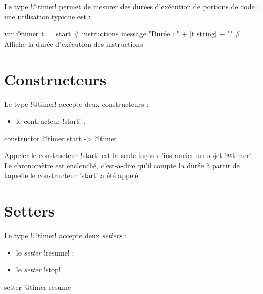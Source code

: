 



Le type \ggsq!@timer! permet de mesurer des durées d'exécution de portions de code ; une utilisation typique est :

\begin{galgas4}
var @timer t = .start
  # instructions
message "Durée : " + [t string] + "\n" # Affiche la durée d'exécution des instructions
\end{galgas4}


\section{Constructeurs}

Le type \ggsq!@timer! accepte deux constructeurs :
\begin{itemize}
  \item le contructeur \ggsq!start! ;
\end{itemize}



\begin{galgas4box}
constructor @timer start -> @timer
\end{galgas4box}

Appeler le constructeur \ggsq!start! est la seule façon d'instancier un objet \ggsq!@timer!. Le chronomètre est enclenché, c'est-à-dire qu'il compte la durée à partir de laquelle le constructeur \ggsq!start! a été appelé.







\section{Setters}

Le type \ggsq!@timer! accepte deux \emph{setters} :
\begin{itemize}
  \item le \emph{setter} \ggsq!resume! ;
  \item le \emph{setter} \ggsq!stop!.
\end{itemize}


\begin{galgas4box}
setter @timer resume
\end{galgas4box}

